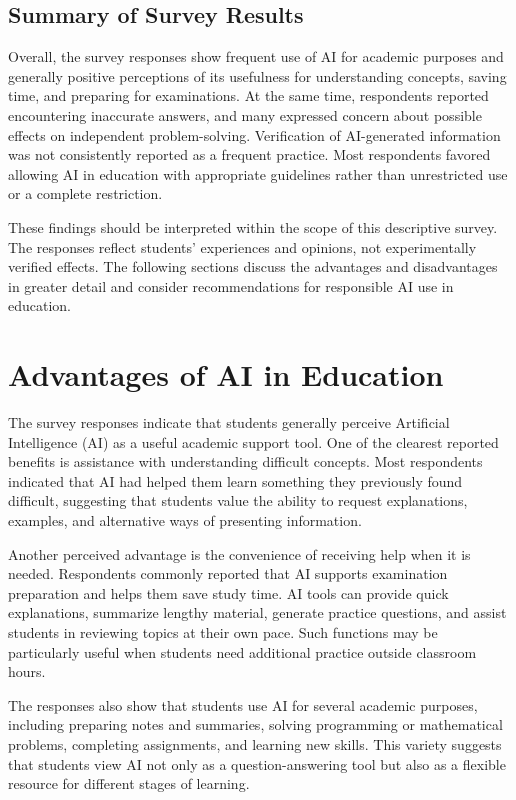 \documentclass[12pt,a4paper]{article}
\begin{document}
\subsection{Summary of Survey Results}
\label{subsec:survey-summary}

Overall, the survey responses show frequent use of AI for academic purposes and generally positive perceptions of its usefulness for understanding concepts, saving time, and preparing for examinations. At the same time, respondents reported encountering inaccurate answers, and many expressed concern about possible effects on independent problem-solving. Verification of AI-generated information was not consistently reported as a frequent practice. Most respondents favored allowing AI in education with appropriate guidelines rather than unrestricted use or a complete restriction.

These findings should be interpreted within the scope of this descriptive survey. The responses reflect students' experiences and opinions, not experimentally verified effects. The following sections discuss the advantages and disadvantages in greater detail and consider recommendations for responsible AI use in education.



\section{Advantages of AI in Education}
\label{sec:advantages-ai}

The survey responses indicate that students generally perceive Artificial Intelligence (AI) as a useful academic support tool. One of the clearest reported benefits is assistance with understanding difficult concepts. Most respondents indicated that AI had helped them learn something they previously found difficult, suggesting that students value the ability to request explanations, examples, and alternative ways of presenting information.

Another perceived advantage is the convenience of receiving help when it is needed. Respondents commonly reported that AI supports examination preparation and helps them save study time. AI tools can provide quick explanations, summarize lengthy material, generate practice questions, and assist students in reviewing topics at their own pace. Such functions may be particularly useful when students need additional practice outside classroom hours.

The responses also show that students use AI for several academic purposes, including preparing notes and summaries, solving programming or mathematical problems, completing assignments, and learning new skills. This variety suggests that students view AI not only as a question-answering tool but also as a flexible resource for different stages of learning.
\end{document}
